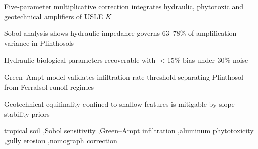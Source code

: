 \documentclass[preprint,review,12pt,authoryear]{elsarticle}
\begin{document}
\begin{frontmatter}
\begin{abstract}
The $K$-factor nomograph underestimates erodibility in tropical Plinthosols where subsurface hydraulic impedance, aluminum phytotoxicity and geotechnical vulnerability converge, yet no correction factor has simultaneously addressed these three mechanisms. We evaluated the parametric identifiability and physical consistency of a five-parameter multiplicative correction ($K_{\mathrm{plint}} = K_{\mathrm{RUSLE}} \times \alpha \times \beta \times \gamma$) through five computational tests anchored in field-measured properties of a Haplic Plinthosol (basic infiltration rate 1.53--3.13~cm/h, aluminum saturation 15--99\%, six erosion features) and virtual Ferralsol and Acrisol profiles. Synthetic calibration recovered the three hydraulic-biological parameters with bias below 15\% under 30\% observational noise, whereas the geotechnical pair exhibited equifinality mitigable by slope-stability priors. Sobol global analysis indicated that the hydraulic exponent governs 63--78\% of amplification variance in the Plinthosol, while the toxicity term dominates in the Ferralsol, consistent with the pedological contrast between soil classes. Green--Ampt simulation yielded a runoff coefficient of 0.56 for the Plinthosol under 60~mm/h intensity versus zero runoff in the Ferralsol, validating the infiltration-rate threshold embedded in the hydraulic factor. The multiplicative structure appears sufficiently identifiable for the hydraulic-biological parameters to support field calibration on instrumented erosion plots.
\end{abstract}

\begin{highlights}
\item Five-parameter multiplicative correction integrates hydraulic, phytotoxic and geotechnical amplifiers of USLE $K$
\item Sobol analysis shows hydraulic impedance governs 63--78\% of amplification variance in Plinthosols
\item Hydraulic-biological parameters recoverable with $<$15\% bias under 30\% noise
\item Green--Ampt model validates infiltration-rate threshold separating Plinthosol from Ferralsol runoff regimes
\item Geotechnical equifinality confined to shallow features is mitigable by slope-stability priors
\end{highlights}

\begin{keyword}
tropical soil \sep Sobol sensitivity \sep Green--Ampt infiltration \sep aluminum phytotoxicity \sep gully erosion \sep nomograph correction
\end{keyword}

\end{frontmatter}
\end{document}
